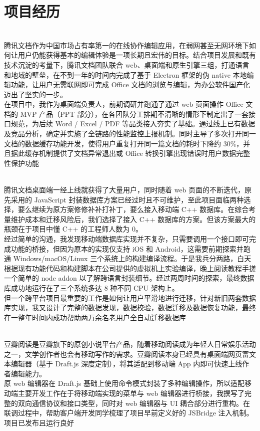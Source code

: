 \documentclass[11pt,a4paper,roman]{moderncv}   %
\begin{document}
\section{项目经历}
{\\腾讯文档作为中国市场占有率第一的在线协作编辑应用，在弱网甚至无网环境下如何让用户仍能获得基本的编辑体验是一项长期且宏伟的目标。结合项目发展和既有技术沉淀的考量下，腾讯文档团队联合 web、桌面端和原生引擎三组，打通语言和地域的壁垒，在不到一年的时间内完成了基于 Electron 框架的伪 native 本地编辑功能，让用户无需联网即可完成 Office 文档的浏览与编辑，为办公软件国产化迈出了坚实的一步。\\
在项目中，我作为桌面端负责人，前期调研并跑通了通过 web 页面操作 Office 文档的 MVP 产品（PPT 部分），在各团队分工排期不清晰的情形下制定出了一套接口规范，为后续 Word / Excel / PDF 等品类接入夯实了基础。通过线上已有数据及竞品分析，确定并实施了全链路的性能监控上报机制。同时主导了多次打开同一文档的数据缓存功能开发，使得用户重复打开同一篇文档的耗时下降约 30\%，并且据此缓存机制提供了文档异常退出或 Office 转换引擎出现错误时用户数据完整性保护功能
}
{}{}

{\\腾讯文档桌面端一经上线就获得了大量用户，同时随着 web 页面的不断迭代，原先采用的 JavaScript 封装数据库方案已经过时且不可维护，至此项目面临两种选择，要么继续为原方案修修补补打补丁，要么接入移动端 C++ 数据库。在综合考量维护成本和迁移风险后，我们选择了接入 C++ 数据库的方案。但该方案最大的瓶颈在于项目中懂 C++ 的工程师人数为 0。\\
经过简单的沟通，我发现移动端数据库实现并不复杂，只需要调用一个接口即可完成功能的桥接，但因为原本的实现仅支持 iOS 和 Android，这需要前期探索并跑通 Windows/macOS/Linux 三个系统上的构建编译流程。于是我兵分两路，白天根据现有功能代码和构建脚本在公司提供的虚拟机上实验编译，晚上阅读教程手搓一个简单的 node addon 以了解跨语言封装细节。经过两周时间的探索，最终数据库成功地运行在了三个系统多达 8 种不同 CPU 架构上。\\
但一个跨平台项目最重要的工作是如何让用户平滑地进行迁移，针对新旧两套数据库实现，我又设计了完整的数据发现，数据校验，数据迁移及数据恢复功能，最终在一整年时间内成功帮助两万余名老用户全自动迁移数据库
}
{}{}

{\\豆瓣阅读是豆瓣旗下的原创小说平台产品，随着移动阅读成为年轻人日常娱乐活动之一，文学创作者也会有移动写作的需求。豆瓣阅读本身已经具有桌面端网页富文本编辑器（基于 Draft.js 深度定制），将其适配到移动端 App 内即可快速上线作者编辑能力。\\
原 web 编辑器在 Draft.js 基础上使用命令模式封装了多种编辑操作，所以适配移动端主要开发工作在于将移动端实现的菜单与 web 编辑器进行桥接，我撰写了完整的双向通信协议和接口类型，同时对 web 编辑器与 UI 耦合部分进行重构。在联调过程中，帮助客户端开发同学梳理了项目早前定义好的 JSBridge 注入机制。项目已发布且运行良好}
{}{}
\end{document}
